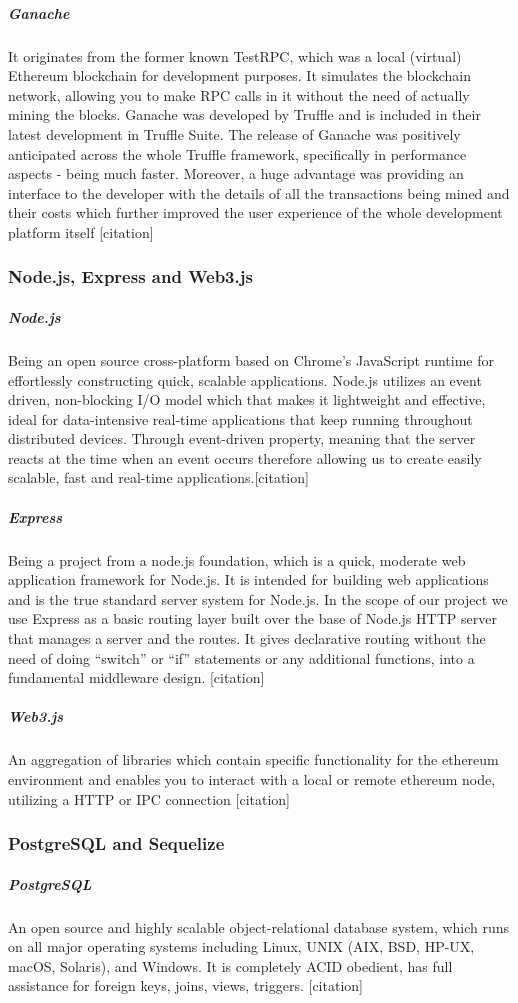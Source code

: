 \subparagraph{Ganache}
It originates from the former known TestRPC,  which was a local (virtual) Ethereum blockchain for development purposes. It simulates the blockchain network, allowing you to make RPC calls in it without the need of actually mining the blocks. Ganache was developed by Truffle and is included in their latest development in Truffle Suite. The release of Ganache was positively anticipated across the whole Truffle framework, specifically in performance aspects - being much faster. Moreover, a huge advantage was providing an interface to the developer with the details of all the transactions being mined and their costs which further improved the user experience of the whole development platform itself [citation]


\subsubsection{Node.js, Express and Web3.js}

\subparagraph{Node.js}
Being an open source cross-platform based on Chrome's JavaScript runtime for effortlessly constructing quick, scalable applications. Node.js utilizes an event driven, non-blocking I/O model which that makes it lightweight and effective, ideal for data-intensive real-time applications that keep running throughout distributed devices. Through event-driven property, meaning that the server reacts at the time when an event occurs therefore allowing us to create easily scalable, fast and real-time applications.[citation]

\subparagraph{Express}

Being a project from a node.js foundation, which is a quick, moderate web application framework for Node.js. It is intended for building web applications and is the true standard server system for Node.js. In the scope of our project we use Express as a basic routing layer built over the base of Node.js HTTP server that manages a server and the routes. It gives declarative routing without the need of doing “switch” or “if” statements or any additional functions, into a fundamental middleware design. [citation]

\subparagraph{Web3.js}
An aggregation of libraries which contain specific functionality for the ethereum environment and enables you to interact with a local or remote ethereum node, utilizing a HTTP or IPC connection [citation]



\subsubsection{PostgreSQL and Sequelize}
\subparagraph{PostgreSQL}
An open source and highly scalable object-relational database system, which runs on all major operating systems including Linux, UNIX (AIX, BSD, HP-UX, macOS, Solaris), and Windows. It is completely ACID obedient, has full assistance for foreign keys, joins, views, triggers. [citation]

